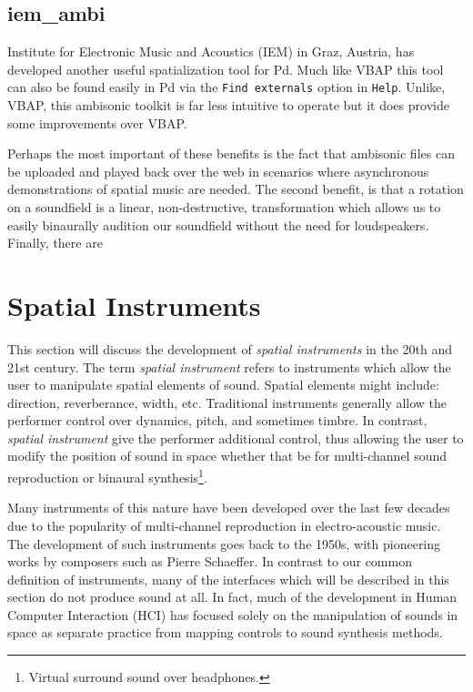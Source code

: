 \subsection{iem\_ambi}

Institute for Electronic Music and Acoustics (IEM) in Graz, Austria, has developed another useful spatialization tool for Pd. Much like VBAP this tool can also be found easily in Pd via the \texttt{Find externals} option in \texttt{Help}. Unlike, VBAP, this ambisonic toolkit is far less intuitive to operate but it does provide some improvements over VBAP. 

Perhaps the most important of these benefits is the fact that ambisonic files can be uploaded and played back over the web in scenarios where asynchronous demonstrations of spatial music are needed. The second benefit, is that a rotation on a soundfield is a linear, non-destructive, transformation which allows us to easily binaurally audition our soundfield without the need for loudspeakers. Finally, there are



\section{Spatial Instruments}

This section will discuss the development of \textit{spatial instruments} in the 20th and 21st century. The term \textit{spatial instrument} refers to instruments which allow the user to manipulate spatial elements of sound. Spatial elements might include: direction, reverberance, width, etc. Traditional instruments generally allow the performer control over dynamics, pitch, and sometimes timbre. In contrast, \textit{spatial instrument} give the performer additional control, thus allowing the user to modify the position of sound in space whether that be for multi-channel sound reproduction or binaural synthesis\footnote{Virtual surround sound over headphones.}. 

Many instruments of this nature have been developed over the last few decades due to the popularity of multi-channel reproduction in electro-acoustic music. The development of such instruments goes back to the 1950s, with pioneering works by composers such as Pierre Schaeffer. In contrast to our common definition of instruments, many of the interfaces which will be described in this section do not produce sound at all. In fact, much of the development in Human Computer Interaction (HCI) has focused solely on the manipulation of sounds in space as separate practice from mapping controls to sound synthesis methods.  

